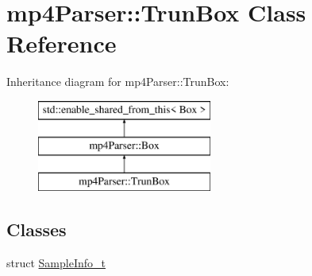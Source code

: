 \hypertarget{classmp4_parser_1_1_trun_box}{}\section{mp4\+Parser\+::Trun\+Box Class Reference}
\label{classmp4_parser_1_1_trun_box}
Inheritance diagram for mp4\+Parser\+::Trun\+Box\+:\begin{figure}[H]
\begin{center}
\leavevmode
\includegraphics[height=3.000000cm]{classmp4_parser_1_1_trun_box}
\end{center}
\end{figure}
\subsection*{Classes}
\begin{DoxyCompactItemize}
\item 
struct \mbox{\hyperlink{structmp4_parser_1_1_trun_box_1_1_sample_info__t}{Sample\+Info\+\_\+t}}
\end{DoxyCompactItemize}
